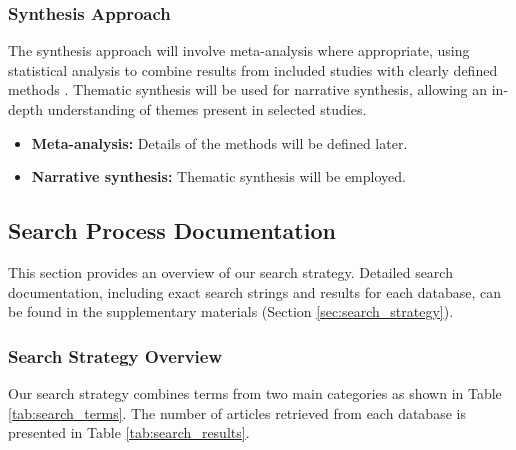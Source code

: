 \subsubsection{Synthesis Approach}
The synthesis approach will involve meta-analysis where appropriate, using statistical analysis to
combine results from included studies with clearly defined methods
\cite{ben-nun_demystifying_2020}. Thematic synthesis will be used for narrative synthesis, allowing
an in-depth understanding of themes present in selected studies.
\begin{itemize}
	\item \textbf{Meta-analysis:} Details of the methods will be defined later.
	\item \textbf{Narrative synthesis:} Thematic synthesis will be employed.
\end{itemize}

\subsection{Search Process Documentation}
\label{sec:search_process_documentation}
This section provides an overview of our search strategy. Detailed search documentation, including exact search strings and results for each database, can be found in the supplementary materials (Section \ref{sec:search_strategy}).

\subsubsection{Search Strategy Overview}
Our search strategy combines terms from two main categories as shown in Table
\ref{tab:search_terms}. The number of articles retrieved from each database is presented in Table
\ref{tab:search_results}.

